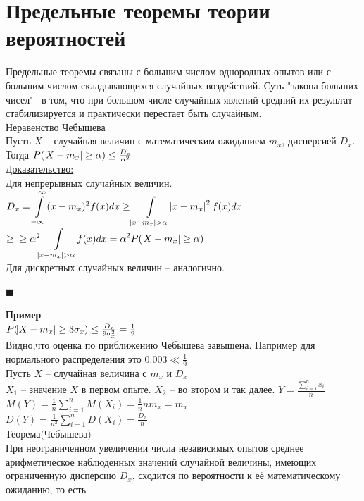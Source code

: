 \documentclass[russian, 12pt, fleqn]{article}
\begin{document}
\section{Предельные теоремы теории вероятностей}
\noindent
Предельные теоремы связаны с большим числом однородных опытов или с большим числом складывающихся случайных воздействий. Суть "закона больших чисел"  \ в том, что при большом числе случайных явлений средний их результат стабилизируется и практически перестает быть случайным.\\
\underline{Неравенство Чебышева}\\
Пусть $X$ -- случайная величин с математическим ожиданием $m_x$, дисперсией $D_x$.\\
Тогда $P(\abs{X - m_x} \geq \alpha) \leq \frac{D_x}{\alpha^2}$\\
\underline{Доказательство:}\\
Для непрерывных случайных величин. \\
$D_x =  \displaystyle{\int\limits_{-\infty}^{\infty} }(x-m_x)^2 f(x) dx \geq \displaystyle{\int\limits_{\abs{x - m_x} > \alpha} } \abs{x-m_x}^2 f(x) dx$
$\geq  \\ \geq \alpha^2  \displaystyle{\int\limits_{\abs{x - m_x} > \alpha} }f(x) dx = \alpha^2 P(\abs{X - m_x} \geq \alpha)$ \\
Для дискретных случайных величин -- аналогично.\\
\begin{flushright}\(\blacksquare\)\end{flushright}
\textbf{Пример} \\
$P(\abs{X - m_x} \geq  3 \sigma_x) \leq  \frac{D_x}{9\sigma_x^2} = \frac{1}{9}$\\
Видно,что оценка по  приближению Чебышева  завышена.  Например для нормального распределения это $0.003 \ll \frac{1}{9}$\\
Пусть $X$ -- случайная величина с $m_x$  и $D_x$\\
$X_1$ -- значение $X$ в первом опыте. $X_2$ -- во втором и так далее. $Y = \frac{\displaystyle{\sum\limits_{i = 1}  ^ {n} x_i}}{n}$ $M(Y) = \frac{1}{n} \displaystyle{\sum\limits_{i = 1}^{n}} M(X_i) = \frac{1}{n} n m_x = m_x$\\
$D(Y)  = \frac{1}{n^2}\displaystyle{\sum\limits_{i = 1}^{n}} D(X_i) = \frac{D_x}{n}$\\
$\textbf{Теорема(Чебышева)}$\\
При неограниченном увеличении числа независимых опытов среднее арифметическое наблюденных значений случайной величины, имеющих ограниченную дисперсию $D_x$, сходится по вероятности к её математическому ожиданию, то есть
\end{document}
